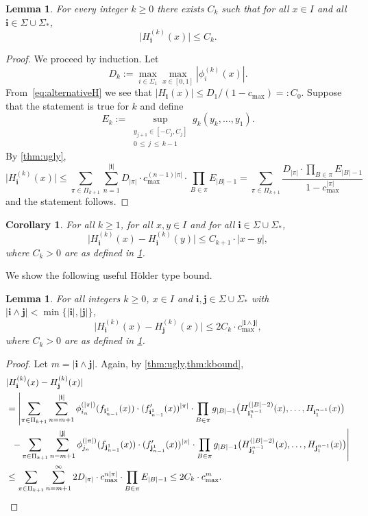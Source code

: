\documentclass[11pt,]{article}
\def\cref#1{\ref{#1}}%
\newtheorem{corollary}[theorem]{Corollary}
\newtheorem{lemma}[theorem]{Lemma}
\theoremstyle{definition}
\theoremstyle{remark}
\newcommand{\0}{\mathbf{0}}
\newcommand{\bi}{\mathbf{i}}
\newcommand{\bj}{\mathbf{j}}
\begin{document}
\begin{lemma}\label{thm:kbound}
For every integer $k\geq 0$ there exists $C_k$ such that for all $x\in I$ and all
$\bi\in\Sigma\cup\Sigma_*$,
\[
\big|H_{\bi}^{(k)}(x)\big|\leq C_k.
\]
\end{lemma}
\begin{proof}
We proceed by induction. Let
\[
D_k:=\max_{i\in\Sigma_1}\max_{x\in[0,1]} |\phi_i^{(k)}(x)|.
\]
From~\cref{eq:alternativeH} we see that
$|H_{\bi}(x)| \leq D_1/(1-c_{\max})=:C_0$.
Suppose that the statement is true for $k$ and define
\begin{equation}\label{eq:E_k}
E_k:= \sup_{\substack{y_{j+1}\in[-C_j,C_j]\\0\,\leq\, j \,\leq\, k-1}}g_k(y_k,\dots,y_1).
\end{equation}
By \cref{thm:ugly},
\[
\big|H_{\bi}^{(k)}(x)\big| \leq \sum_{\pi\in\Pi_{k+1}}\sum_{n=1}^{|\bi|} D_{|\pi|} \cdot
c_{\max}^{(n-1)|\pi|} \cdot \prod_{B\in\pi}
E_{|B|-1}
= \sum_{\pi\in\Pi_{k+1}} \frac{D_{|\pi|}\cdot \prod_{B\in\pi}E_{|B|-1}}{1-c_{\max}^{|\pi|}}
\]
and the statement follows.
\end{proof}
\begin{corollary}
\label{thm:difcor}
For all $k\geq 1$, for all $x,y\in I$ and for all $\bi\in\Sigma\cup\Sigma_*$,
\[
\big|H_{\bi}^{(k)}(x) - H_{\bi}^{(k)}(y)\big| \leq C_{k+1}\cdot |x-y|,
\]
where $C_k>0$ are as defined in \cref{thm:kbound}. 
\end{corollary}
We show the following useful H\"older type bound. 
\begin{lemma}\label{thm:difbound}
For all integers $k\geq 0$, $x\in I$ and $\bi,\bj\in\Sigma\cup\Sigma_*$ with
$|\bi\wedge\bj|<\min\{|\bi|,|\bj|\}$,
\[
\big|H_{\bi}^{(k)}(x) - H_{\bj}^{(k)}(x)\big| \leq 2C_k\cdot c_{\max}^{|\bi\wedge\bj|},
\]
where $C_k>0$ are as defined in \cref{thm:kbound}. 
\end{lemma}
\begin{proof}
  Let $m = |\bi\wedge\bj|$. Again, by \cref{thm:ugly,thm:kbound},
  \begin{align*}
	&|H_{\bi}^{(k)}(x) - H_{\bj}^{(k)}(x)|
	\\
	&=
	\left|
	\sum_{\pi\in\Pi_{k+1}} \sum_{n=m+1}^{|\bi|} \phi_{i_n}^{(|\pi|)}(f_{\bi_{n-1}^1}(x))\cdot 
	(f'_{\bi_{n-1}^1}(x))^{|\pi|} \cdot
	\prod_{B\in\pi} g_{|B|-1}\big(H_{\bi_1^{n-1}}^{(|B|-2)}(x),\dots,H_{\bi_1^{n-1}}(x)\big)
      \right.
      \\
	&
	\left.\;\; -
	  \sum_{\pi\in\Pi_{k+1}} \sum_{n=m+1}^{|\bj|} \phi_{j_n}^{(|\pi|)}(f_{\bj_{n-1}^1}(x))\cdot
	  (f'_{\bj_{n-1}^1}(x))^{|\pi|} \cdot
	  \prod_{B\in\pi} g_{|B|-1}\big(H_{\bj_1^{n-1}}^{(|B|-2)}(x),\dots,H_{\bj_1^{n-1}}(x)\big)
	  \right|\\
	&\leq
	\sum_{\pi\in\Pi_{k+1}}\sum_{n=m+1}^\infty 2D_{|\pi|}\cdot c_{\max}^{n|\pi|} \cdot
	\prod_{B\in\pi} E_{|B|-1}
	\leq 2 C_{k}\cdot c_{\max}^m.
	\qedhere
  \end{align*}
\end{proof}
\end{document}
